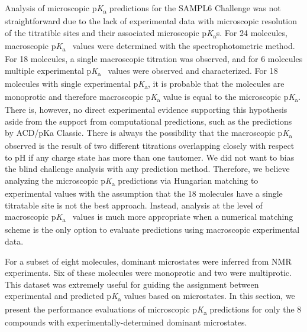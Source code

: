 \documentclass[9pt,lineno,final]{elife}
\newcommand{\pKa}{p\textit{K}\textsubscript{a}}
\begin{document}
Analysis of microscopic \pKa{} predictions for the SAMPL6 Challenge was not straightforward due to the lack of experimental data with microscopic resolution of the titratible sites and their associated microscopic \pKa{}s. 
For 24 molecules, macroscopic \pKa{}~ values were determined with the spectrophotometric method. 
For 18 molecules, a single macroscopic titration was observed, and for 6 molecules multiple experimental \pKa{}~ values were observed and characterized. 
For 18 molecules with single experimental \pKa{}, it is probable that the molecules are monoprotic and therefore macroscopic \pKa{} value is equal to the microscopic \pKa{}.
There is, however, no direct experimental evidence supporting this hypothesis aside from the support from computational predictions, such as the predictions by ACD/pKa Classic. 
There is always the possibility that the macroscopic \pKa{} observed is the result of two different titrations overlapping closely with respect to pH if any charge state has more than one tautomer. 
We did not want to bias the blind challenge analysis with any prediction method. 
Therefore, we believe analyzing the microscopic \pKa{} predictions via Hungarian matching to experimental values with the assumption that the 18 molecules have a single titratable site is not the best approach. 
Instead, analysis at the level of macroscopic \pKa{}~ values is much more appropriate when a numerical matching scheme is the only option to evaluate predictions using macroscopic experimental data.

For a subset of eight molecules, dominant microstates were inferred from NMR experiments. Six of these molecules were monoprotic and two were multiprotic.
This dataset was extremely useful for guiding the assignment between experimental and predicted \pKa{} values based on microstates. 
In this section, we present the performance evaluations of microscopic \pKa{} predictions for only the 8 compounds with experimentally-determined dominant microstates.
\end{document}
